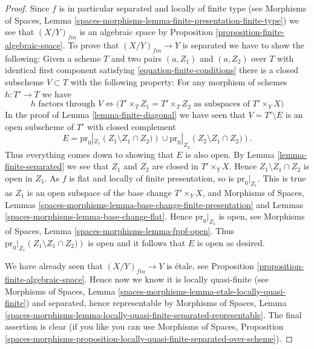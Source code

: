 \documentclass{stacks-project}
\theoremstyle{plain}
\theoremstyle{definition}
\theoremstyle{remark}
\numberwithin{equation}{subsection}
\begin{document}
\begin{proof}
Since $f$ is in particular separated and locally of finite type (see
Morphisms of Spaces,
Lemma \ref{spaces-morphisms-lemma-finite-presentation-finite-type})
we see that $(X/Y)_{fin}$ is an algebraic space by
Proposition \ref{proposition-finite-algebraic-space}.
To prove that $(X/Y)_{fin} \to Y$ is separated we have to show
the following: Given a scheme $T$ and two pairs $(a, Z_1)$ and $(a, Z_2)$
over $T$
with identical first component satisfying \ref{equation-finite-conditions}
there is a closed subscheme $V \subset T$ with the following
property: For any morphism of schemes $h : T' \to T$ we have
$$
h \text{ factors through } V \Leftrightarrow
\Big(T' \times_T Z_1 = T' \times_T Z_2
\text{ as subspaces of }T' \times_Y X\Big)
$$
In the proof of
Lemma \ref{lemma-finite-diagonal}
we have seen that $V = T' \setminus E$ is an open subscheme of $T'$
with closed complement
$$
E =
\text{pr}_0|_{Z_1}\left(Z_1 \setminus Z_1 \cap Z_2)\right)
\cup
\text{pr}_0|_{Z_2}\left(Z_2 \setminus Z_1 \cap Z_2)\right).
$$
Thus everything comes down to showing that $E$ is also open. By
Lemma \ref{lemma-finite-separated}
we see that $Z_1$ and $Z_2$ are closed in $T' \times_Y X$. Hence
$Z_1 \setminus Z_1 \cap Z_2$ is open in $Z_1$. As $f$ is flat and
locally of finite presentation, so is $\text{pr}_0|_{Z_1}$.
This is true as $Z_1$ is an open subspace of the base change
$T' \times_Y X$, and
Morphisms of Spaces,
Lemmas \ref{spaces-morphisms-lemma-base-change-finite-presentation} and
Lemmas \ref{spaces-morphisms-lemma-base-change-flat}.
Hence $\text{pr}_0|_{Z_1}$ is open, see
Morphisms of Spaces, Lemma \ref{spaces-morphisms-lemma-fppf-open}.
Thus $\text{pr}_0|_{Z_1}\left(Z_1 \setminus Z_1 \cap Z_2)\right)$ is
open and it follows that $E$ is open as desired.

\medskip\noindent
We have already seen that $(X/Y)_{fin} \to Y$ is \'etale, see
Proposition \ref{proposition-finite-algebraic-space}.
Hence now we know it is locally quasi-finite (see
Morphisms of Spaces,
Lemma \ref{spaces-morphisms-lemma-etale-locally-quasi-finite})
and separated, hence representable by
Morphisms of Spaces, Lemma
\ref{spaces-morphisms-lemma-locally-quasi-finite-separated-representable}.
The final assertion is clear (if you like you can use
Morphisms of Spaces, Proposition
\ref{spaces-morphisms-proposition-locally-quasi-finite-separated-over-scheme}).
\end{proof}
\end{document}
